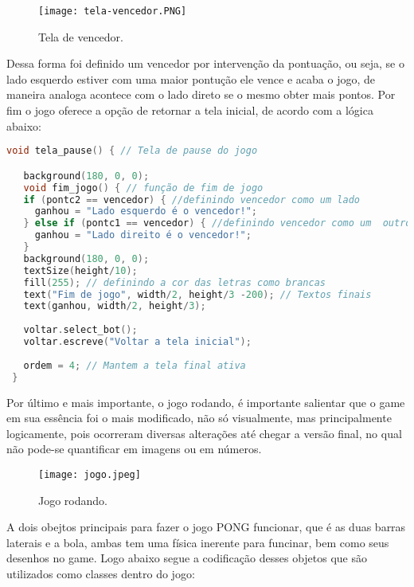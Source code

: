   \begin{figure}[htbp]
   \centerline{
      \texttt{[image: tela-vencedor.PNG]}
      }
   \caption{Tela de vencedor.}
   \label{fig}
  \end{figure}
Dessa forma foi definido um vencedor por intervenção da pontuação, ou seja, se o lado esquerdo estiver com uma maior pontução 
ele vence e acaba o jogo, de maneira analoga acontece com o lado direto se o mesmo obter mais pontos. Por fim o jogo
oferece a opção de retornar a tela inicial, de acordo com a lógica abaixo:
\begin{lstlisting}[language=C]
   void tela_pause() { // Tela de pause do jogo

   background(180, 0, 0);
   void fim_jogo() { // função de fim de jogo
   if (pontc2 == vencedor) { //definindo vencedor como um lado
     ganhou = "Lado esquerdo é o vencedor!";
   } else if (pontc1 == vencedor) { //definindo vencedor como um  outro lado
     ganhou = "Lado direito é o vencedor!";
   }
   background(180, 0, 0);
   textSize(height/10);
   fill(255); // definindo a cor das letras como brancas
   text("Fim de jogo", width/2, height/3 -200); // Textos finais
   text(ganhou, width/2, height/3);
 
   voltar.select_bot();
   voltar.escreve("Voltar a tela inicial");
 
   ordem = 4; // Mantem a tela final ativa
 }
  \end{lstlisting}

  Por último e mais importante, o jogo rodando, é importante salientar que o game em sua essência foi o mais modificado, não só 
  visualmente, mas principalmente logicamente, pois ocorreram diversas alterações até chegar a versão final, no qual não pode-se quantificar
  em imagens ou em números.


  \begin{figure}[htbp]
   \centerline{
      \texttt{[image: jogo.jpeg]}
      }
   \caption{Jogo rodando.}
   \label{fig}
    \end{figure}
\vspace{2cm}


    A dois obejtos principais para fazer o jogo PONG funcionar, que é as duas barras laterais e a bola, ambas tem
    uma física inerente para funcinar, bem como seus desenhos no game. Logo abaixo segue a codificação desses objetos
    que são utilizados como classes dentro do jogo:

